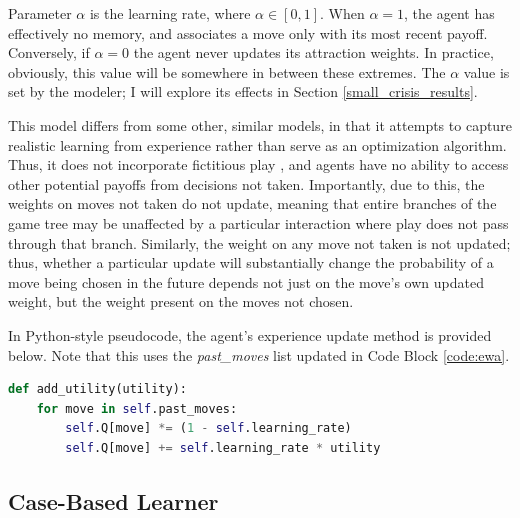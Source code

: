 Parameter $\alpha$ is the learning rate, where $\alpha \in {[0, 1]}$. When $\alpha=1$, the agent has effectively no memory, and associates a move only with its most recent payoff. Conversely, if $\alpha=0$ the agent never updates its attraction weights. In practice, obviously, this value will be somewhere in between these extremes. The $\alpha$ value is set by the modeler; I will explore its effects in Section \ref{small_crisis_results}.

This model differs from some other, similar models, in that it attempts to capture realistic learning from experience rather than serve as an optimization algorithm. Thus, it does not incorporate fictitious play \citep{shoham_2003}, and agents have no ability to access other potential payoffs from decisions not taken. Importantly, due to this, the weights on moves not taken do not update, meaning that entire branches of the game tree may be unaffected by a particular interaction where play does not pass through that branch. Similarly, the weight on any move not taken is not updated; thus, whether a particular update will substantially change the probability of a move being chosen in the future depends not just on the move's own updated weight, but the weight present on the moves not chosen.

In Python-style pseudocode, the agent's experience update method is provided below. Note that this uses the \emph{past\_moves} list updated in Code Block \ref{code:ewa}.

\begin{singlespace}
\begin{lstlisting}[language=python,caption={Reinforcement Learning},label={code:rl_update}]
def add_utility(utility):
    for move in self.past_moves:
        self.Q[move] *= (1 - self.learning_rate)
        self.Q[move] += self.learning_rate * utility
\end{lstlisting}
\end{singlespace}

\subsection{Case-Based Learner}\label{case-based-learner}

